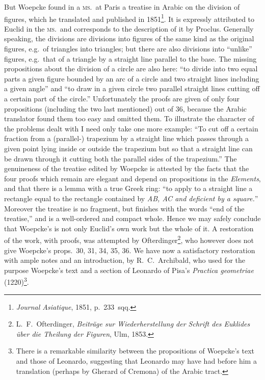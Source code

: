 But Woepcke found in a \textsc{ms.}\ at Paris a treatise in Arabic on the division of figures, which he translated and published in 1851\footnote{\emph{Journal Asiatique}, 1851, p.~233~sqq.}. It is expressly attributed to Euclid in the \textsc{ms.}\ and corresponds to the description of it by Proclus. Generally speaking, the divisions are divisions into figures of the same kind as the original figures, e.g.~of triangles into triangles; but there are also divisions into ``unlike'' figures, e.g.~that of a triangle by a straight line parallel to the base. The missing propositions about the division of a circle are also here: ``to divide into two equal parts a given figure bounded by an arc of a circle and two straight lines including a given angle'' and ``to draw in a given circle two parallel straight lines cutting off a certain part of the circle.'' Unfortunately the proofs are given of only four propositions (including the two last mentioned) out of 36, because the Arabic translator found them too easy and omitted them. To illustrate the character of the problems dealt with I need only take one more example: ``To cut off a certain fraction from a (parallel-) trapezium by a straight line which passes through a given point lying inside or outside the trapezium but so that a straight line can be drawn through it cutting both the parallel sides of the trapezium.'' The genuineness of the treatise edited by Woepcke is attested by the facts that the four proofs which remain are elegant and depend on propositions in the \emph{Elements}, and that there is a lemma with a true Greek ring: ``to apply to a straight line a rectangle equal to the rectangle contained by \emph{AB, AC and deficient by a square.}'' Moreover the treatise is no fragment, but finishes with the words ``end of the treatise,'' and is a well-ordered and compact whole. Hence we may safely conclude that Woepcke's is not only Euclid's own work but the whole of it. A restoration of the work, with proofs, was attempted by Ofterdinger\footnote{L.~F.~Ofterdinger, \emph{Beiträge sur Wiederherstellung der Schrift des Euklides über die Theilung der Figuren}, Ulm, 1853.}, who however does not give Woepcke's props.~30, 31, 34, 35, 36. We have now a satisfactory restoration with ample notes and an introduction, by R.~C.~Archibald, who used for the purpose Woepcke's text and a section of Leonardo of Pisa's \emph{Practica geometriae} (1220)\footnote{There is a remarkable similarity between the propositions of Woepcke's text and those of Leonardo, suggesting that Leonardo may have had before him a translation (perhaps by Gherard of Cremona) of the Arabic tract.}.

